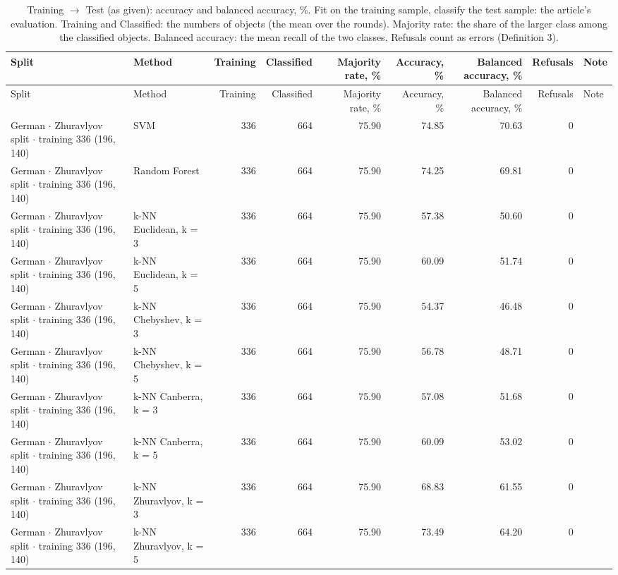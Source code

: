 \begin{longtable}{llrrrrrrl}
  \caption{Training $\to$ Test (as given): accuracy and balanced accuracy, \%. Fit on the training sample, classify the test sample: the article's evaluation. Training and Classified: the numbers of objects (the mean over the rounds). Majority rate: the share of the larger class among the classified objects. Balanced accuracy: the mean recall of the two classes. Refusals count as errors (Definition 3).}\label{tab:direct} \\
  \toprule
  Split & Method & Training & Classified & Majority rate, \% & Accuracy, \% & Balanced accuracy, \% & Refusals & Note \\
  \midrule
  \endfirsthead
  \toprule
  Split & Method & Training & Classified & Majority rate, \% & Accuracy, \% & Balanced accuracy, \% & Refusals & Note \\
  \midrule
  \endhead
  \bottomrule
  \endfoot
  German $\cdot$ Zhuravlyov split $\cdot$ training 336 (196, 140) & SVM & 336 & 664 & 75.90 & 74.85 & 70.63 & 0 &  \\
  German $\cdot$ Zhuravlyov split $\cdot$ training 336 (196, 140) & Random Forest & 336 & 664 & 75.90 & 74.25 & 69.81 & 0 &  \\
  German $\cdot$ Zhuravlyov split $\cdot$ training 336 (196, 140) & k-NN Euclidean, k = 3 & 336 & 664 & 75.90 & 57.38 & 50.60 & 0 &  \\
  German $\cdot$ Zhuravlyov split $\cdot$ training 336 (196, 140) & k-NN Euclidean, k = 5 & 336 & 664 & 75.90 & 60.09 & 51.74 & 0 &  \\
  German $\cdot$ Zhuravlyov split $\cdot$ training 336 (196, 140) & k-NN Chebyshev, k = 3 & 336 & 664 & 75.90 & 54.37 & 46.48 & 0 &  \\
  German $\cdot$ Zhuravlyov split $\cdot$ training 336 (196, 140) & k-NN Chebyshev, k = 5 & 336 & 664 & 75.90 & 56.78 & 48.71 & 0 &  \\
  German $\cdot$ Zhuravlyov split $\cdot$ training 336 (196, 140) & k-NN Canberra, k = 3 & 336 & 664 & 75.90 & 57.08 & 51.68 & 0 &  \\
  German $\cdot$ Zhuravlyov split $\cdot$ training 336 (196, 140) & k-NN Canberra, k = 5 & 336 & 664 & 75.90 & 60.09 & 53.02 & 0 &  \\
  German $\cdot$ Zhuravlyov split $\cdot$ training 336 (196, 140) & k-NN Zhuravlyov, k = 3 & 336 & 664 & 75.90 & 68.83 & 61.55 & 0 &  \\
  German $\cdot$ Zhuravlyov split $\cdot$ training 336 (196, 140) & k-NN Zhuravlyov, k = 5 & 336 & 664 & 75.90 & 73.49 & 64.20 & 0 &  \\

\end{longtable}
